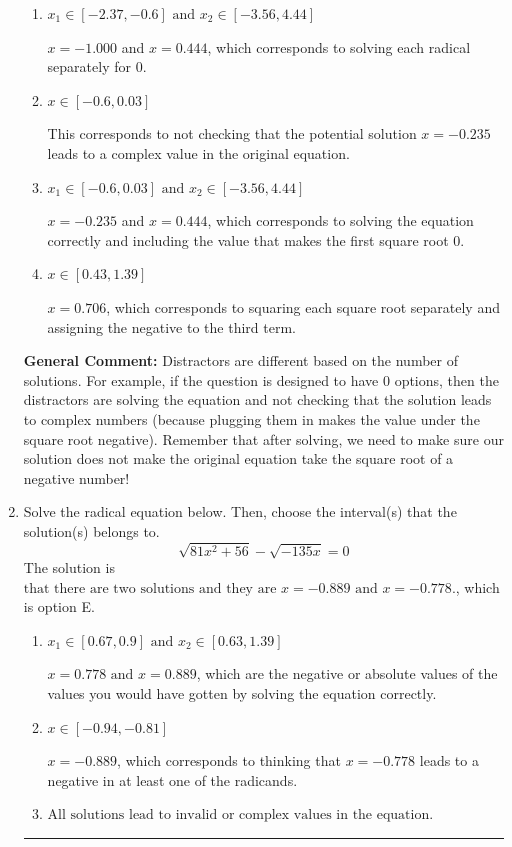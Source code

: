 \documentclass{extbook}[14pt]
\newcommand{\litem}[1]{\item #1

\rule{\textwidth}{0.4pt}}
\begin{document}
\begin{enumerate}
{\begin{enumerate}[label=\Alph*.]
*$x = -0.235$ leads to a complex value in the equation, so this is the correct option.
\item \( x_1 \in [-2.37, -0.6] \text{ and } x_2 \in [-3.56,4.44] \)

$x = -1.000$ and $x = 0.444$, which corresponds to solving each radical separately for 0.
\item \( x \in [-0.6,0.03] \)

This corresponds to not checking that the potential solution $x = -0.235$ leads to a complex value in the original equation.
\item \( x_1 \in [-0.6, 0.03] \text{ and } x_2 \in [-3.56,4.44] \)

$x = -0.235$ and $x = 0.444$, which corresponds to solving the equation correctly and including the value that makes the first square root 0.
\item \( x \in [0.43,1.39] \)

$x = 0.706$, which corresponds to squaring each square root separately and assigning the negative to the third term.
\end{enumerate}

\textbf{General Comment:} Distractors are different based on the number of solutions. For example, if the question is designed to have 0 options, then the distractors are solving the equation and not checking that the solution leads to complex numbers (because plugging them in makes the value under the square root negative). Remember that after solving, we need to make sure our solution does not make the original equation take the square root of a negative number!
}
\litem{
Solve the radical equation below. Then, choose the interval(s) that the solution(s) belongs to.
\[ \sqrt{81 x^2 + 56} - \sqrt{-135 x} = 0 \]The solution is \( \text{that there are two solutions and they are } x = -0.889 \text{ and } x = -0.778. \), which is option E.\begin{enumerate}[label=\Alph*.]
\item \( x_1 \in [0.67, 0.9] \text{ and } x_2 \in [0.63,1.39] \)

$x = 0.778 \text{ and } x = 0.889$, which are the negative or absolute values of the values you would have gotten by solving the equation correctly.
\item \( x \in [-0.94,-0.81] \)

$x = -0.889$, which corresponds to thinking that $x = -0.778$ leads to a negative in at least one of the radicands.
\item \( \text{All solutions lead to invalid or complex values in the equation.} \)


\end{enumerate}}
\end{enumerate}
\end{document}
